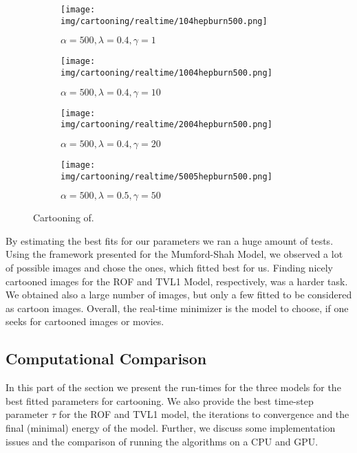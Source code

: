         \begin{figure}[ht]
            \centering
            \begin{subfigure}[b]{0.45\textwidth}
                \texttt{[image: img/cartooning/realtime/104hepburn500.png]}
                \caption{$\alpha = 500, \lambda = 0.4, \gamma = 1$}
            \end{subfigure}
            \begin{subfigure}[b]{0.45\textwidth}
                \texttt{[image: img/cartooning/realtime/1004hepburn500.png]}
                \caption{$\alpha = 500, \lambda = 0.4, \gamma = 10$}
            \end{subfigure}
            \begin{subfigure}[b]{0.45\textwidth}
                \texttt{[image: img/cartooning/realtime/2004hepburn500.png]}
                \caption{$\alpha = 500, \lambda = 0.4, \gamma = 20$}
            \end{subfigure}
            \begin{subfigure}[b]{0.45\textwidth}
                \texttt{[image: img/cartooning/realtime/5005hepburn500.png]}
                \caption{$\alpha = 500, \lambda = 0.5, \gamma = 50$}
            \end{subfigure}
            \caption{Cartooning of.}
        \label{fig:cartooning_hepburn_realtime}
        \end{figure}

        By estimating the best fits for our parameters we ran a huge amount of tests. Using the framework presented for the Mumford-Shah Model, we observed a lot of possible images and chose the ones, which fitted best for us. Finding nicely cartooned images for the ROF and TVL1 Model, respectively, was a harder task. We obtained also a large number of images, but only a few fitted to be considered as cartoon images. Overall, the real-time minimizer is the model to choose, if one seeks for cartooned images or movies.

    \subsection{Computational Comparison} %
    \label{sub:computational_comparison}
        
        In this part of the section we present the run-times for the three models for the best fitted parameters for cartooning. We also provide the best time-step parameter $\tau$ for the ROF and TVL1 model, the iterations to convergence and the final (minimal) energy of the model. Further, we discuss some implementation issues and the comparison of running the algorithms on a CPU and GPU.

